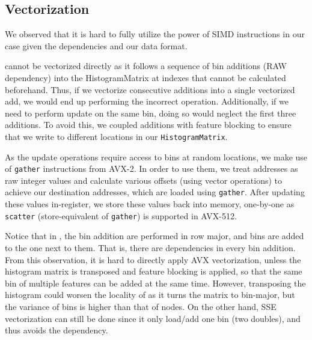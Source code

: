 \subsection{Vectorization}
We observed that it is hard to fully utilize the power of SIMD instructions in our case given the dependencies and our data format. 

\mypar{\update}
\update cannot be vectorized directly as it follows a sequence of bin additions (RAW dependency) into the HistogramMatrix at indexes that cannot be calculated beforehand. Thus, if we vectorize consecutive additions into a single vectorized add, we would end up performing the incorrect operation. Additionally, if we need to perform update on the same bin, doing so would neglect the first three additions. To avoid this, we coupled additions with feature blocking to ensure that we write to different locations in our \texttt{HistogramMatrix}. 

As the update operations require access to bins at random locations, we make use of \texttt{gather} instructions from AVX-2. In order to use them, we treat addresses as raw integer values and calculate various offsets (using vector operations) to achieve our destination addresses, which are loaded using \texttt{gather}. After updating these values in-register, we store these values back into memory, one-by-one as \texttt{scatter} (store-equivalent of \texttt{gather}) is supported in AVX-512.

\mypar{\cumulate}
Notice that in \cumulate, the bin addition are performed in row major, and bins are added to the one next to them. That is, there are dependencies in every bin addition.
From this observation, it is hard to directly apply AVX vectorization, unless the histogram matrix is transposed and feature blocking is applied, so that the same bin of multiple features can be added at the same time. However, transposing the histogram could worsen the locality of \update as it turns the matrix to bin-major, but the variance of bins is higher than that of nodes. On the other hand, SSE vectorization can still be done since it only load/add one bin (two doubles), and thus avoids the dependency.


